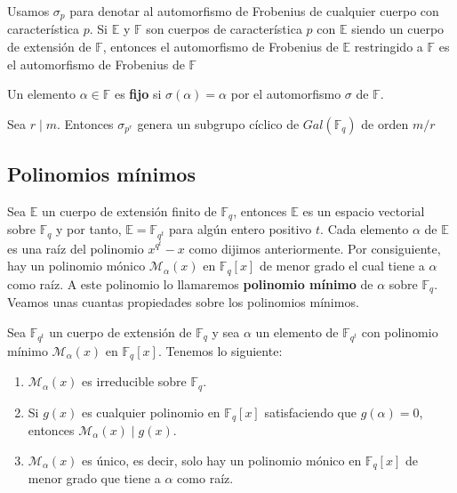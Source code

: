 Usamos $\sigma_p$ para denotar al automorfismo de Frobenius de cualquier cuerpo con característica $p$. Si $\mathbb{E}$ y $\mathbb{F}$ son cuerpos de característica $p$ con $\mathbb{E}$ siendo un cuerpo de extensión de $\mathbb{F}$, entonces el automorfismo de Frobenius de $\mathbb{E}$ restringido a $\mathbb{F}$ es el automorfismo de Frobenius de $\mathbb{F}$ 


\begin{definition}
Un elemento $\alpha \in \mathbb{F}$ es \textbf{fijo} si $\sigma(\alpha) = \alpha$ por el automorfismo $\sigma$ de $\mathbb{F}$.
\end{definition}

Sea $ r \mid m$. Entonces $\sigma_{p^r}$ genera un subgrupo cíclico de $Gal(\mathbb{F}_q)$ de orden $m/r$


\subsection{Polinomios mínimos}

Sea $\mathbb{E}$ un cuerpo de extensión finito de $\mathbb{F}_q$, entonces $\mathbb{E}$ es un espacio vectorial sobre $\mathbb{F}_q$ y por tanto, $\mathbb{E} = \mathbb{F}_{q^t}$ para algún entero positivo $t$. Cada elemento $\alpha$ de $\mathbb{E}$ es una raíz del polinomio $x^{q^t}-x$ como dijimos anteriormente. Por consiguiente, hay un polinomio mónico $\mathcal{M}_\alpha(x)$ en $\mathbb{F}_q[x]$ de menor grado el cual tiene a $\alpha$ como raíz. A este polinomio lo llamaremos \textbf{polinomio mínimo} de $\alpha$ sobre $\mathbb{F}_q$. Veamos unas cuantas propiedades sobre los polinomios mínimos. 

\begin{theorem}
\label{th:prop_pol}
Sea $\mathbb{F}_{q^t}$ un cuerpo de extensión de $\mathbb{F}_q$ y sea $\alpha$ un elemento de $\mathbb{F}_{q^t}$ con polinomio mínimo $\mathcal{M}_\alpha(x)$ en $\mathbb{F}_q[x]$. Tenemos lo siguiente:
\begin{enumerate}
	\item $\mathcal{M}_\alpha(x)$ es irreducible sobre $\mathbb{F}_q$.
	\item Si $g(x)$ es cualquier polinomio en $\mathbb{F}_q[x]$  satisfaciendo que $g(\alpha) = 0$, entonces $\mathcal{M}_\alpha(x) \mid g(x)$.
	\item $\mathcal{M}_\alpha(x)$ es único, es decir, solo hay un polinomio mónico en $\mathbb{F}_q[x]$ de menor grado que tiene a $\alpha$ como raíz.
\end{enumerate}
\end{theorem}

